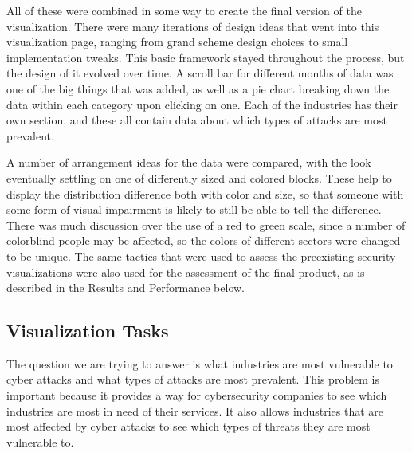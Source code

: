 \documentclass[journal]{vgtc}                %
\begin{document}
All of these were combined in some way to create the final version of the visualization.
There were many iterations of design ideas that went into this visualization page, ranging from grand scheme design choices to small implementation tweaks.
This basic framework stayed throughout the process, but the design of it evolved over time. 
A scroll bar for different months of data was one of the big things that was added, as well as a pie chart breaking down the data within each category upon clicking on one.
Each of the industries has their own section, and these all contain data about which types of attacks are most prevalent.

A number of arrangement ideas for the data were compared, with the look eventually settling on one of differently sized and colored blocks.
These help to display the distribution difference both with color and size, so that someone with some form of visual impairment is likely to still be able to tell the difference.
There was much discussion over the use of a red to green scale, since a number of colorblind people may be affected, so the colors of different sectors were changed to be unique.
The same tactics that were used to assess the preexisting security visualizations were also used for the assessment of the final product, as is described in the Results and Performance below.

\subsection{Visualization Tasks}
The question we are trying to answer is what industries are most vulnerable to cyber attacks and what types of attacks are most prevalent. 
This problem is important because it provides a way for cybersecurity companies to see which industries are most in need of their services. 
It also allows industries that are most affected by cyber attacks to see which types of threats they are most vulnerable to.
\end{document}
